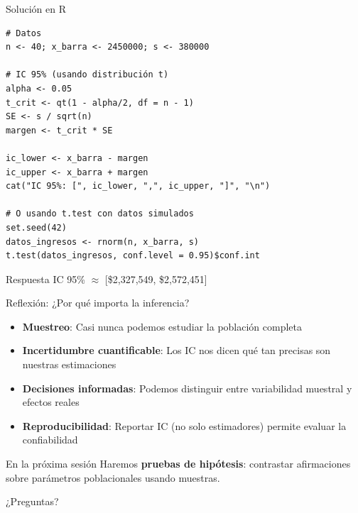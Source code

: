 \documentclass[aspectratio=169,11pt]{beamer}
\begin{document}
\begin{frame}[fragile]{Solución en R}
\begin{lstlisting}[basicstyle=\ttfamily\tiny]
# Datos
n <- 40; x_barra <- 2450000; s <- 380000

# IC 95% (usando distribución t)
alpha <- 0.05
t_crit <- qt(1 - alpha/2, df = n - 1)
SE <- s / sqrt(n)
margen <- t_crit * SE

ic_lower <- x_barra - margen
ic_upper <- x_barra + margen
cat("IC 95%: [", ic_lower, ",", ic_upper, "]", "\n")

# O usando t.test con datos simulados
set.seed(42)
datos_ingresos <- rnorm(n, x_barra, s)
t.test(datos_ingresos, conf.level = 0.95)$conf.int
\end{lstlisting}

\pause
\small
\begin{exampleblock}{Respuesta}
IC 95\% $\approx$ [\$2,327,549, \$2,572,451]
\end{exampleblock}
\end{frame}

\begin{frame}{Reflexión: ¿Por qué importa la inferencia?}
\begin{itemize}
  \item \textbf{Muestreo}: Casi nunca podemos estudiar la población completa
  \pause
  \item \textbf{Incertidumbre cuantificable}: Los IC nos dicen qué tan precisas son nuestras estimaciones
  \pause
  \item \textbf{Decisiones informadas}: Podemos distinguir entre variabilidad muestral y efectos reales
  \pause
  \item \textbf{Reproducibilidad}: Reportar IC (no solo estimadores) permite evaluar la confiabilidad
\end{itemize}

\pause

\vspace{0.4cm}

\begin{alertblock}{En la próxima sesión}
Haremos \textbf{pruebas de hipótesis}: contrastar afirmaciones sobre parámetros poblacionales usando muestras.
\end{alertblock}
\end{frame}

\begin{frame}[plain]
\begin{center}
\Huge \textcolor{uddblue}{¿Preguntas?}
\end{center}
\end{frame}
\end{document}
